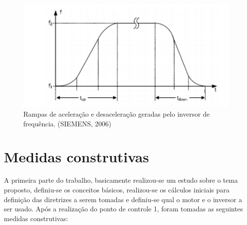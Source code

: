 \begin{figure}[h!]
	\centering
		\includegraphics[keepaspectratio=true,scale=0.9]{figuras/4.png}
	\caption{Rampas de aceleração e desaceleração geradas pelo inversor de frequência. (SIEMENS, 2006)}
    \label{rampas}
\end{figure}

\section{Medidas construtivas}

A primeira parte do trabalho, basicamente realizou-se um estudo sobre o tema proposto, definiu-se os conceitos básicos, realizou-se os cálculos iniciais para definição das diretrizes a serem tomadas e definiu-se qual o motor e o inversor a ser usado. Após a realização do ponto de controle 1, foram tomadas as seguintes medidas construtivas:

